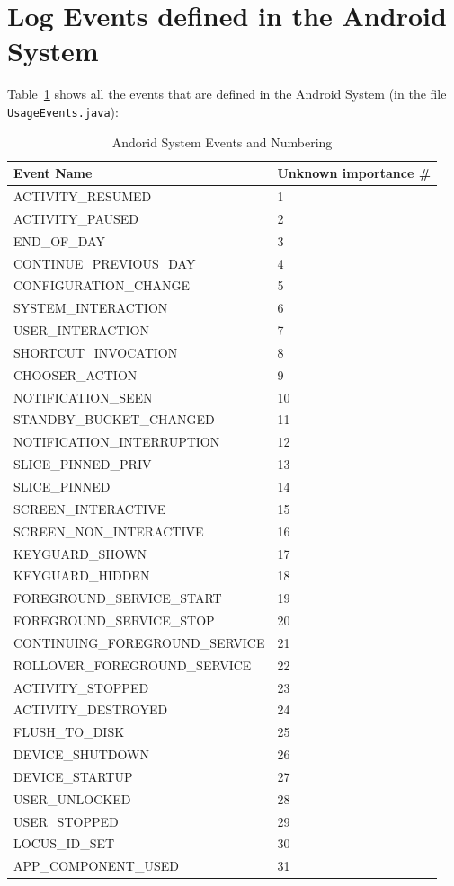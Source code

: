 \documentclass[11pt]{article}
\begin{document}
\section{Log Events defined in the Android System}
Table~\ref{tab:android_events} shows all the events that are defined in the Android System (in the file \verb+UsageEvents.java+):
\begin{table}
\centering
\caption{Andorid System Events and Numbering}
\label{tab:android_events}
\begin{tabular}{|l|l|}
\hline
Event Name & Unknown importance \# \\
\hline
\hline
ACTIVITY\_RESUMED & 1 \\
        ACTIVITY\_PAUSED & 2 \\
        END\_OF\_DAY & 3 \\
        CONTINUE\_PREVIOUS\_DAY & 4\\
        CONFIGURATION\_CHANGE & 5 \\
        SYSTEM\_INTERACTION & 6 \\
        USER\_INTERACTION & 7 \\
        SHORTCUT\_INVOCATION & 8 \\
        CHOOSER\_ACTION & 9 \\
        NOTIFICATION\_SEEN & 10 \\
        STANDBY\_BUCKET\_CHANGED & 11 \\
        NOTIFICATION\_INTERRUPTION & 12 \\
        SLICE\_PINNED\_PRIV & 13 \\
        SLICE\_PINNED & 14 \\
        SCREEN\_INTERACTIVE & 15 \\
        SCREEN\_NON\_INTERACTIVE & 16 \\
        KEYGUARD\_SHOWN & 17 \\
        KEYGUARD\_HIDDEN & 18 \\
        FOREGROUND\_SERVICE\_START & 19 \\
        FOREGROUND\_SERVICE\_STOP & 20 \\
        CONTINUING\_FOREGROUND\_SERVICE & 21\\
        ROLLOVER\_FOREGROUND\_SERVICE & 22\\
        ACTIVITY\_STOPPED & 23\\
        ACTIVITY\_DESTROYED & 24\\
        FLUSH\_TO\_DISK & 25 \\
        DEVICE\_SHUTDOWN & 26 \\
        DEVICE\_STARTUP & 27 \\
        USER\_UNLOCKED & 28\\
        USER\_STOPPED & 29\\
        LOCUS\_ID\_SET & 30 \\
        APP\_COMPONENT\_USED & 31 \\
        \hline
\end{tabular}
\end{table}
\end{document}
